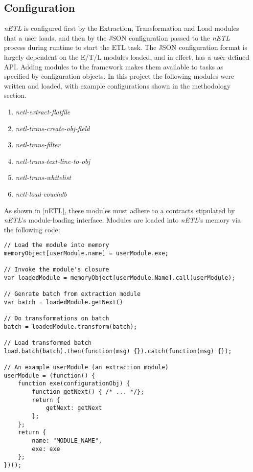 \subsection{Configuration}

\textit{nETL} is configured first by the Extraction, Transformation and Load modules that a user loads, and then by the JSON configuration passed to the \textit{nETL} process during runtime to start the ETL task. The JSON configuration format is largely dependent on the E/T/L modules loaded, and in effect, has a user-defined API. Adding modules to the framework makes them available to tasks as specified by configuration objects. In this project the following modules were written and loaded, with example configurations shown in the methodology section.

\begin{enumerate}
    \item \textit{netl-extract-flatfile}
    \item \textit{netl-trans-create-obj-field}
    \item \textit{netl-trans-filter}
    \item \textit{netl-trans-text-line-to-obj}
    \item \textit{netl-trans-whitelist}
    \item \textit{netl-load-couchdb}
\end{enumerate}

As shown in \ref{nETL}, these modules must adhere to a contracts stipulated by \textit{nETL}'s module-loading interface. Modules are loaded into \textit{nETL}'s memory via the following code:

\begin{verbatim}
// Load the module into memory
memoryObject[userModule.name] = userModule.exe;

// Invoke the module's closure
var loadedModule = memoryObject[userModule.Name].call(userModule);

// Genrate batch from extraction module
var batch = loadedModule.getNext()

// Do transformations on batch
batch = loadedModule.transform(batch);

// Load transformed batch
load.batch(batch).then(function(msg) {}).catch(function(msg) {});

// An example userModule (an extraction module)
userModule = (function() {
    function exe(configurationObj) {
        function getNext() { /* ... */};
        return {
            getNext: getNext
        };
    };
    return {
        name: "MODULE_NAME",
        exe: exe
    };
})();
\end{verbatim}